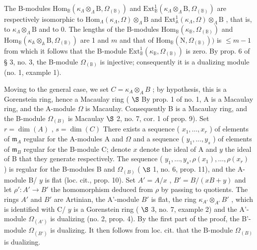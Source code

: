 The B-modules \(\mathrm{Hom}_{\mathbb{B}}(\kappa_{\Lambda}\otimes_{\Lambda}\mathrm{B},\Omega_{(\mathbb{B})})\) and \(\mathrm{Ext}_{\mathbb{B}}^{1}(\kappa_{\Lambda}\otimes_{\Lambda}\mathrm{B},\Omega_{(\mathbb{B})})\) are respectively isomorphic to \(\mathrm{Hom}_{\Lambda}(\kappa_{\Lambda},\Omega)\otimes_{\Lambda}\mathrm{B}\) and \(\mathrm{Ext}_{\mathbb{A}}^{1}(\kappa_{\Lambda},\Omega)\otimes_{\Lambda}\mathrm{B}\) , that is, to \(\kappa_{\Lambda}\otimes_{\Lambda}\mathrm{B}\) and to 0. The lengths of the B-modules \(\mathrm{Hom}_{\mathbb{B}}(\kappa_{\mathbb{B}},\Omega_{(\mathbb{B})})\) and \(\mathrm{Hom}_{\mathbb{B}}(\kappa_{\mathbb{A}}\otimes_{\mathbb{A}}\mathrm{B},\Omega_{(\mathbb{B})})\) are 1 and \(m\) and that of \(\mathrm{Hom}_{\mathbb{B}}(\mathrm{N},\Omega_{(\mathbb{B})}))\) is \(\leqslant m - 1\) from which it follows that the B-module \(\mathrm{Ext}_{\mathbb{B}}^{1}(\kappa_{\mathbb{B}},\Omega_{(\mathbb{B})})\) is zero. By prop. 6 of § 3, no. 3, the B-module \(\Omega_{(\mathbb{B})}\) is injective; consequently it is a dualizing module (no. 1, example 1).

Moving to the general case, we set \(C = \kappa_A \otimes_A B\) ; by hypothesis, this is a Gorenstein ring, hence a Macaulay ring ( \(\S\) By prop. 1 of no. 1, A is a Macaulay ring, and the A-module \(\Omega\) is Macaulay. Consequently B is a Macaulay ring, and the B-module \(\Omega_{(B)}\) is Macaulay \(\S\) 2, no. 7, cor. 1 of prop. 9). Set \(r = \dim(A)\) , \(s = \dim(C)\) There exists a sequence ( \(x_1, \ldots, x_r\) ) of elements of \(\mathfrak{m}_A\) regular for the A-modules A and \(\Omega\) and a sequence ( \(y_1, \ldots, y_s\) ) of elements of \(\mathfrak{m}_B\) regular for the B-module C; denote \(x\) denote the ideal of A and \(y\) the ideal of B that they generate respectively. The sequence ( \(y_1, \ldots, y_s, \rho(x_1), \ldots, \rho(x_r)\) ) is regular for the B-modules B and \(\Omega_{(B)}\) ( \(\S\) 1, no. 6, prop. 11), and the A-module B/ \(y\) is flat (loc. cit., prop. 10). Set \(A' = A/x\) , \(B' = B/(xB + y)\) and let \(\rho': A' \to B'\) the homomorphism deduced from \(\rho\) by passing to quotients. The rings \(A'\) and \(B'\) are Artinian, the A'-module \(B'\) is flat, the ring \(\kappa_{A'} \otimes_{A'} B'\) , which is identified with C/ \(y\) is a Gorenstein ring ( \(\S\) 3, no. 7, example 2) and the A'-module \(\Omega_{(A')}\) is dualizing (no. 2, prop. 4). By the first part of the proof, the B'-module \(\Omega_{(B')}\) is dualizing. It then follows from loc. cit. that the B-module \(\Omega_{(B)}\) is dualizing.

